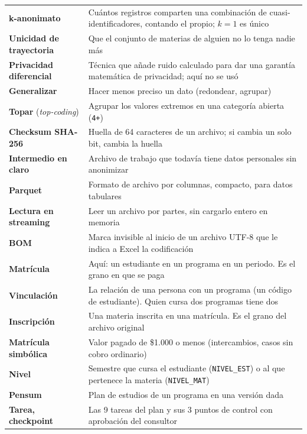 \documentclass[11pt,a4paper,twoside,twocolumn]{article}
\newcommand{\cod}[1]{\nolinkurl{#1}}
\begin{document}
{\begin{xltabular}{\textwidth}{@{}P{4.2cm} L@{}}
\textbf{k-anonimato} & Cuántos registros comparten una combinación de cuasi-identificadores, contando el propio; $k = 1$ es único \\
\textbf{Unicidad de trayectoria} & Que el conjunto de materias de alguien no lo tenga nadie más \\
\textbf{Privacidad diferencial} & Técnica que añade ruido calculado para dar una garantía matemática de privacidad; aquí no se usó \\
\textbf{Generalizar} & Hacer menos preciso un dato (redondear, agrupar) \\
\textbf{Topar} (\emph{top-coding}) & Agrupar los valores extremos en una categoría abierta (\cod{4+}) \\
\textbf{Checksum SHA-256} & Huella de 64 caracteres de un archivo; si cambia un solo bit, cambia la huella \\
\textbf{Intermedio en claro} & Archivo de trabajo que todavía tiene datos personales sin anonimizar \\
\textbf{Parquet} & Formato de archivo por columnas, compacto, para datos tabulares \\
\textbf{Lectura en streaming} & Leer un archivo por partes, sin cargarlo entero en memoria \\
\textbf{BOM} & Marca invisible al inicio de un archivo UTF-8 que le indica a Excel la codificación \\
\textbf{Matrícula} & Aquí: un estudiante en un programa en un periodo. Es el grano en que se paga \\
\textbf{Vinculación} & La relación de una persona con un programa (un código de estudiante). Quien cursa dos programas tiene dos \\
\textbf{Inscripción} & Una materia inscrita en una matrícula. Es el grano del archivo original \\
\textbf{Matrícula simbólica} & Valor pagado de \$1.000 o menos (intercambios, casos sin cobro ordinario) \\
\textbf{Nivel} & Semestre que cursa el estudiante (\cod{NIVEL_EST}) o al que pertenece la materia (\cod{NIVEL_MAT}) \\
\textbf{Pensum} & Plan de estudios de un programa en una versión dada \\
\textbf{Tarea, checkpoint} & Las 9 tareas del plan y sus 3 puntos de control con aprobación del consultor \\
\end{xltabular}
}

\end{document}
